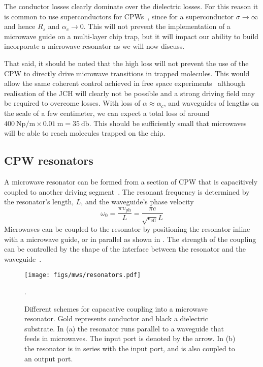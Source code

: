 The conductor losses clearly dominate over the dielectric losses. For this
reason it is common to use superconductors for CPWs~\cite{}, since for a
superconductor $\sigma \to \infty$ and hence $R_s$ and $\alpha_c \to 0$.
This will not prevent the implementation of a microwave guide on a multi-layer
chip trap, but it will impact our ability to build incorporate a microwave
resonator as we will now discuss.

That said, it should be noted that the high loss will not prevent the use of
the CPW to directly drive microwave transitions in trapped molecules. This
would allow the same coherent control achieved in free space
experiments~\cite{WilliamsMagnetic2018} although realisation of the JCH will
clearly not be possible and a strong driving field may be required to overcome
losses.  With loss of $\alpha \approx \alpha_c$, and waveguides of lengths on
the scale of a few centimeter, we can expect a total loss of around
$\SI{400}{\neper\per\metre} \times \SI{0.01}{\metre} = \SI{35}{\decibel}$. This
should be sufficiently small that microwaves will be able to reach molecules
trapped on the chip.~\cite{Treutlein2008}

\subsection{CPW resonators}
\label{mws:resonators}

A microwave resonator can be formed from a section of CPW that is capacitively
coupled to another driving segment~\cite{Day2003}. The resonant frequency is
determined by the resonator's length, $L$, and the waveguide's phase
velocity~\cite{Simons2004}
%
\begin{equation}
  \omega_0 = \frac{\pi v_\text{ph}}{L} = \frac{\pi
  c}{\sqrt{\epsilon_\text{eff}} L}
\end{equation}
%
Microwaves can be coupled to the resonator by positioning the resonator inline
with a microwave guide, or in parallel as shown in
. The strength of the coupling can be controlled by the shape of the
interface between the resonator and the waveguide~\cite{doi:10.1063/1.3010859}.

\begin{figure}
  \centering
  \texttt{[image: figs/mws/resonators.pdf]}
  \caption{Different schemes for capacative coupling into a microwave
    resonator. Gold represents conductor and black a dielectric substrate. In
    (a) the resonator runs parallel to a waveguide that feeds in microwaves.
    The input port is denoted by the arrow. In (b) the resonator is in series
    with the input port, and is also coupled to an output port.
  }
  \label{mws:fig:resonators}.
\end{figure}


